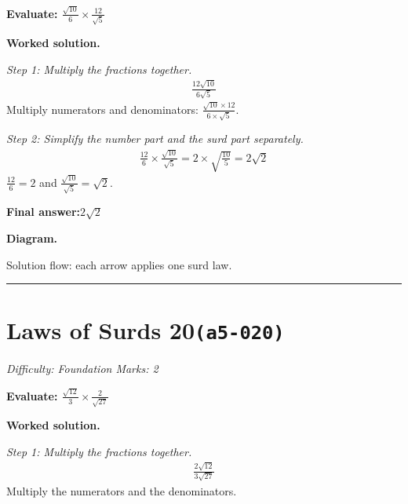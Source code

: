 \documentclass[11pt]{article}
\newcommand{\question}[1]{\par\medskip\noindent\textbf{#1}\par}
\begin{document}
\question{Evaluate: \( \frac{\sqrt{10}}{6} \times \frac{12}{\sqrt{5}} \)}

\textbf{Worked solution.}

\textit{Step 1: Multiply the fractions together.}
\[\begin{gathered}
\frac{12\sqrt{10}}{6\sqrt{5}}
\end{gathered}\]
Multiply numerators and denominators: \( \frac{\sqrt{10} \times 12}{6 \times \sqrt{5}} \).

\textit{Step 2: Simplify the number part and the surd part separately.}
\[\begin{gathered}
\frac{12}{6} \times \frac{\sqrt{10}}{\sqrt{5}} = 2 \times \sqrt{\frac{10}{5}} = 2\sqrt{2}
\end{gathered}\]
\( \frac{12}{6} = 2 \) and \( \frac{\sqrt{10}}{\sqrt{5}} = \sqrt{2} \).

\begin{answerbox}
\textbf{Final answer:}\quad \(\displaystyle 2\sqrt{2}\)
\end{answerbox}
\textbf{Diagram.}

\begin{center}
\end{center}
\small Solution flow: each arrow applies one surd law.\normalsize

\medskip\hrule

\section*{Laws of Surds 20\quad\small\texttt{(a5-020)}}
\textit{Difficulty: Foundation \quad\textbar\quad Marks: 2}

\question{Evaluate: \( \frac{\sqrt{12}}{3} \times \frac{2}{\sqrt{27}} \)}

\textbf{Worked solution.}

\textit{Step 1: Multiply the fractions together.}
\[\begin{gathered}
\frac{2\sqrt{12}}{3\sqrt{27}}
\end{gathered}\]
Multiply the numerators and the denominators.
\end{document}
